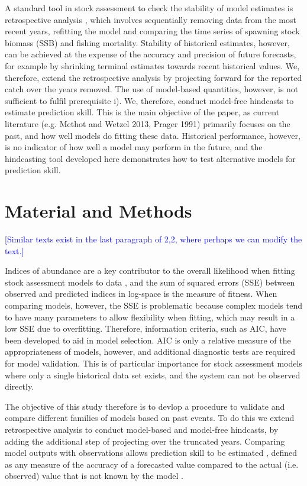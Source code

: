 \documentclass[12pt,halfline,a4paper,nonumbib]{ouparticle}
\newcommand{\toshi}{\textcolor{blue}}
\begin{document}
A standard tool in stock assessment to check the stability of model estimates is retrospective analysis \parencite{hurtado2014looking}, which involves sequentially removing data from the most recent years, refitting the model and comparing the time series of spawning stock biomass (SSB) and fishing mortality. Stability of historical estimates, however, can be achieved at the expense of the accuracy and precision of future forecasts, for example by shrinking terminal estimates towards recent historical values. We, therefore, extend the retrospective analysis by projecting forward for the reported catch over the years removed. The use of model-based quantities, however, is not sufficient to fulfil prerequisite i). We, therefore, conduct model-free hindcasts to estimate prediction skill. This is the main objective of the paper, as current literature (e.g. Methot and Wetzel 2013, Prager 1991) primarily focuses on the past, and how well models do fitting these data. Historical performance, however, is no indicator of how well a model may perform in the future, and the hindcasting tool developed here demonstrates how to test alternative models for prediction skill.  


\section{Material and Methods}

\toshi{[Similar texts exist in the last paragraph of 2,2, where perhaps we can modify the text.]}

Indices of abundance are a key contributor to the overall likelihood when fitting stock assessment models to data \parencite{whitten2013accounting}, and the sum of squared errors (SSE) between observed and predicted indices in log-space is the measure of fitness. When comparing models, however, the SSE is problematic because complex models tend to have many parameters to allow flexibility when fitting, which may result in a low SSE due to overfitting. Therefore, information criteria, such as AIC, have been developed to aid in model selection. AIC is only a relative measure of the appropriateness of models, however, and additional diagnostic tests are required for model validation. This is of particular importance for stock assessment models where only a single historical data set   exists, and the system can not be observed directly. 

The objective of this study therefore is to devlop a procedure to validate and compare different families of models based on past events. To do this we extend retrospective analysis to conduct model-based and model-free hindcasts, by adding the additional step of projecting over the truncated years. Comparing model outputs with observations allows prediction skill to be estimated \parencite{kell2016xval}, defined as any measure of the accuracy of a forecasted value compared to the actual (i.e. observed) value that is not known by the model \parencite{glickman2000glossary}. 
\end{document}
